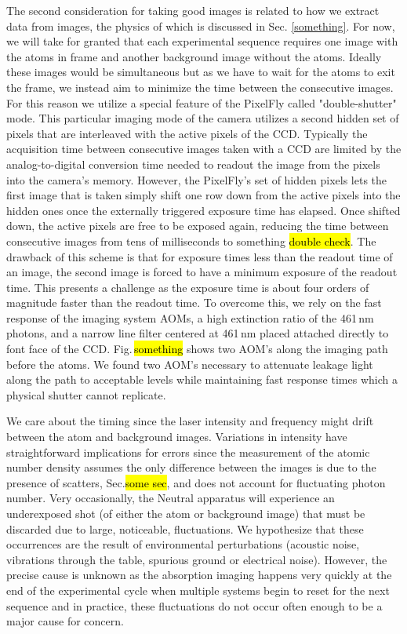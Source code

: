 The second consideration for taking good images is related to how we extract data from images, the physics of which is discussed in Sec. \ref{something}.
For now, we will take for granted that each experimental sequence requires one image with the atoms in frame and another background image without the atoms.
Ideally these images would be simultaneous but as we have to wait for the atoms to exit the frame, we instead aim to minimize the time between the consecutive images.
For this reason we utilize a special feature of the PixelFly called "double-shutter" mode.
This particular imaging mode of the camera utilizes a second hidden set of pixels that are interleaved with the active pixels of the CCD.
Typically the acquisition time between consecutive images taken with a CCD are limited by the analog-to-digital conversion time needed to readout the image from the pixels into the camera's memory.
However, the PixelFly's set of hidden pixels lets the first image that is taken simply shift one row down from the active pixels into the hidden ones once the externally triggered exposure time has elapsed.
Once shifted down, the active pixels are free to be exposed again, reducing the time between consecutive images from tens of milliseconds to something \hl{double check}.
The drawback of this scheme is that for exposure times less than the readout time of an image, the second image is forced to have a minimum exposure of the readout time.
This presents a challenge as the exposure time is about four orders of magnitude faster than the readout time.
To overcome this, we rely on the fast response of the imaging system AOMs, a high extinction ratio of the 461\,nm photons, and a narrow line filter centered at 461\,nm placed attached directly to font face of the CCD.
Fig.\,\hl{something} shows two AOM's along the imaging path before the atoms.
We found two AOM's necessary to attenuate leakage light along the path to acceptable levels while maintaining fast response times which a physical shutter cannot replicate.

We care about the timing since the laser intensity and frequency might drift between the atom and background images. 
Variations in intensity have straightforward implications for errors since the measurement of the atomic number density assumes the only difference between the images is due to the presence of scatters, Sec.\hl{some sec}, and does not account for fluctuating photon number. 
Very occasionally, the Neutral apparatus will experience an underexposed shot (of either the atom or background image) that must be discarded due to large, noticeable, fluctuations. 
We hypothesize that these occurrences are the result of environmental perturbations (acoustic noise, vibrations through the table, spurious ground or electrical noise). 
However, the precise cause is unknown as the absorption imaging happens very quickly at the end of the experimental cycle when multiple systems begin to reset for the next sequence and in practice, these fluctuations do not occur often enough to be a major cause for concern.

